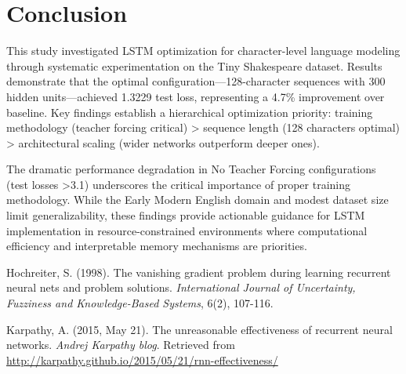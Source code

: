 \documentclass[12pt]{article}
\begin{document}
\section{Conclusion}
\label{sec:conclusion}

This study investigated LSTM optimization for character-level language modeling through systematic experimentation on the Tiny Shakespeare dataset. Results demonstrate that the optimal configuration—128-character sequences with 300 hidden units—achieved 1.3229 test loss, representing a 4.7\% improvement over baseline. Key findings establish a hierarchical optimization priority: training methodology (teacher forcing critical) > sequence length (128 characters optimal) > architectural scaling (wider networks outperform deeper ones).

The dramatic performance degradation in No Teacher Forcing configurations (test losses >3.1) underscores the critical importance of proper training methodology. While the Early Modern English domain and modest dataset size limit generalizability, these findings provide actionable guidance for LSTM implementation in resource-constrained environments where computational efficiency and interpretable memory mechanisms are priorities.


\begin{thebibliography}{99}

Hochreiter, S. (1998). The vanishing gradient problem during learning recurrent neural nets and problem solutions. \textit{International Journal of Uncertainty, Fuzziness and Knowledge-Based Systems}, 6(2), 107-116.

Karpathy, A. (2015, May 21). The unreasonable effectiveness of recurrent neural networks. \textit{Andrej Karpathy blog}. Retrieved from \url{http://karpathy.github.io/2015/05/21/rnn-effectiveness/}


\end{thebibliography}
\end{document}
